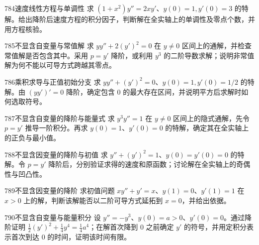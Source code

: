 \begin{exercise}{784}{速度线性方程与单调性}
求 $(1+x^2)y''=2xy'$、$y(0)=1,y'(0)=3$ 的特解。给出降阶后速度方程的积分因子，判断解在全实轴上的单调性及零点个数，并用方程核验。
\end{exercise}
\begin{exercise}{785}{不显含自变量与常值解}
求 $yy''+2(y')^2=0$ 在 $y\ne0$ 区间上的通解，并检查常值解是否包含其中。采用 $p=y'$ 降阶，或利用 $y^3$ 的二阶导数求解；说明非常值解为何不能以可导方式跨越其零点。
\end{exercise}
\begin{exercise}{786}{乘积求导与正值初始分支}
求 $yy''+(y')^2=0$、$y(0)=1,y'(0)=1/2$ 的特解。由 $(yy')'=0$ 降阶，确定包含 $0$ 的最大存在区间，并说明平方后求解时如何选取符号。
\end{exercise}
\begin{exercise}{787}{不显含自变量的降阶与能量式}
求 $y^3y''=1$ 在 $y\ne0$ 区间上的隐式通解，先令 $p=y'$ 推导一阶积分。再求 $y(0)=1$、$y'(0)=0$ 的特解，确定其在全实轴上的正负与最小值。
\end{exercise}
\begin{exercise}{788}{不显含因变量的降阶与初值}
求 $y''+(y')^2=1$、$y(0)=y'(0)=0$ 的特解。令 $p=y'$ 降阶后，分别验证求得的速度和原函数；讨论解在全实轴上的奇偶性与凹凸性。
\end{exercise}
\begin{exercise}{789}{不显含因变量的降阶}
求初值问题 $xy''+y'=x$、$y(1)=0$、$y'(1)=1$ 在 $x>0$ 上的解，判断该解能否以二阶可导方式延拓到 $x=0$，并给出依据。
\end{exercise}
\begin{exercise}{790}{不显含自变量与能量积分}
设 $y''=-y^3$、$y(0)=a>0$、$y'(0)=0$。通过降阶证明 $\frac12(y')^2+\frac14y^4=\frac14a^4$；在解首次降到 $0$ 之前确定 $y'$ 的符号，并用定积分表示首次到达 $0$ 的时间，证明该时间有限。
\end{exercise}
